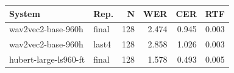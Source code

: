\begin{tabular}{llrrrr}
\toprule
System & Rep. & N & WER & CER & RTF \\
\midrule
wav2vec2-base-960h & final & 128 & 2.474 & 0.945 & 0.003 \\
wav2vec2-base-960h & last4 & 128 & 2.858 & 1.026 & 0.003 \\
hubert-large-ls960-ft & final & 128 & 1.578 & 0.493 & 0.005 \\
\bottomrule
\end{tabular}
